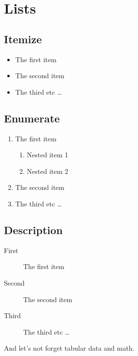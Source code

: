 \documentclass[11pt]{drd-article}
\begin{document}
\section{Lists}

\subsection{Itemize}

\begin{itemize}
  \item The first item
  \item The second item
  \item The third etc \ldots
\end{itemize}

\subsection{Enumerate}

\begin{enumerate}
  \item The first item
  \begin{enumerate}
    \item Nested item 1
    \item Nested item 2
  \end{enumerate}
  \item The second item
  \item The third etc \ldots
\end{enumerate}

\subsection{Description}

\begin{description}
  \item[First] The first item
  \item[Second] The second item
  \item[Third] The third etc \ldots
\end{description}

And let's not forget tabular data and math.
\end{document}

